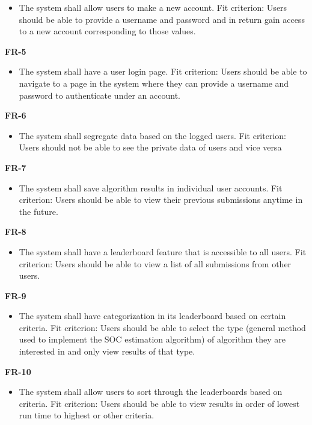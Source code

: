 \documentclass[12pt]{article}
\begin{document}
\begin{itemize}
    \item The system shall allow users to make a new account. \hfill \break
    Fit criterion: Users should be able to provide a username and password and in return gain access to a new account corresponding to those values.
\end{itemize}
\textbf{FR-5}
\begin{itemize}
    \item The system shall have a user login page. \hfill \break
    Fit criterion: Users should be able to navigate to a page in the system where they can provide a username and password to authenticate under an account.
\end{itemize}
\textbf{FR-6}
\begin{itemize}
    \item The system shall segregate data based on the logged users. \hfill \break
    Fit criterion: Users should not be able to see the private data of users and vice versa
\end{itemize}
\textbf{FR-7}
\begin{itemize}
    \item The system shall save algorithm results in individual user accounts. \hfill \break
    Fit criterion: Users should be able to view their previous submissions anytime in the future.
\end{itemize}
\textbf{FR-8}
\begin{itemize}
    \item The system shall have a leaderboard feature that is accessible to all users. \hfill \break
    Fit criterion: Users should be able to view a list of all submissions from other users.
\end{itemize}
\textbf{FR-9}
\begin{itemize}
    \item The system shall have categorization in its leaderboard based on certain criteria. \hfill \break
    Fit criterion: Users should be able to select the type (general method used to implement the SOC estimation algorithm) of algorithm they are interested in and only view results of that type.
\end{itemize}
\textbf{FR-10}
\begin{itemize}
    \item The system shall allow users to sort through the leaderboards based on criteria. \hfill \break
    Fit criterion: Users should be able to view results in order of lowest run time to highest or other criteria.
\end{itemize}
\end{document}
